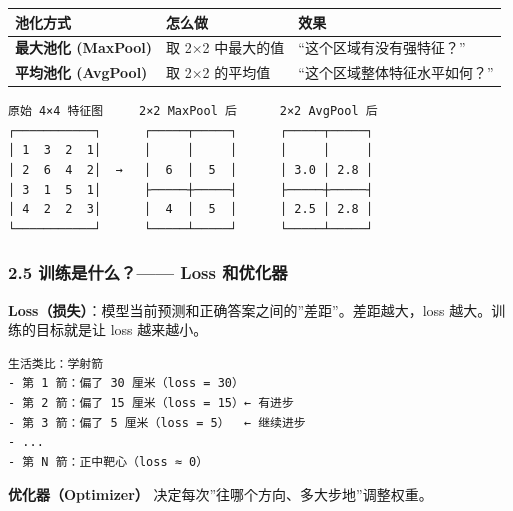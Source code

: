 \documentclass[
  11pt,
]{ctexart}
\newcounter{none} %
\begin{document}
{\def\LTcaptype{none} %
\begin{longtable}[]{@{}
  >{\raggedright\arraybackslash}p{}
  >{\raggedright\arraybackslash}p{}
  >{\raggedright\arraybackslash}p{}@{}}
\toprule\noalign{}
\begin{minipage}[b]{\linewidth}\raggedright
池化方式
\end{minipage} & \begin{minipage}[b]{\linewidth}\raggedright
怎么做
\end{minipage} & \begin{minipage}[b]{\linewidth}\raggedright
效果
\end{minipage} \\
\midrule\noalign{}
\endhead
\bottomrule\noalign{}
\endlastfoot
\textbf{最大池化 (MaxPool)} & 取 2×2 中最大的值 &
“这个区域有没有强特征？” \\
\textbf{平均池化 (AvgPool)} & 取 2×2 的平均值 &
“这个区域整体特征水平如何？” \\
\end{longtable}
}

\begin{verbatim}
原始 4×4 特征图     2×2 MaxPool 后      2×2 AvgPool 后
┌───────────┐      ┌─────┬─────┐      ┌─────┬─────┐
│ 1  3  2  1│      │     │     │      │     │     │
│ 2  6  4  2│  →   │  6  │  5  │      │ 3.0 │ 2.8 │
│ 3  1  5  1│      ├─────┼─────┤      ├─────┼─────┤
│ 4  2  2  3│      │  4  │  5  │      │ 2.5 │ 2.8 │
└───────────┘      └─────┴─────┘      └─────┴─────┘
\end{verbatim}

\subsubsection{2.5 训练是什么？—— Loss
和优化器}\label{ux8badux7ec3ux662fux4ec0ux4e48-loss-ux548cux4f18ux5316ux5668}

\textbf{Loss（损失）}：模型当前预测和正确答案之间的”差距”。差距越大，loss
越大。训练的目标就是让 loss 越来越小。

\begin{verbatim}
生活类比：学射箭
- 第 1 箭：偏了 30 厘米（loss = 30）
- 第 2 箭：偏了 15 厘米（loss = 15）← 有进步
- 第 3 箭：偏了 5 厘米（loss = 5）  ← 继续进步
- ...
- 第 N 箭：正中靶心（loss ≈ 0）
\end{verbatim}

\textbf{优化器（Optimizer）} 决定每次”往哪个方向、多大步地”调整权重。
\end{document}
